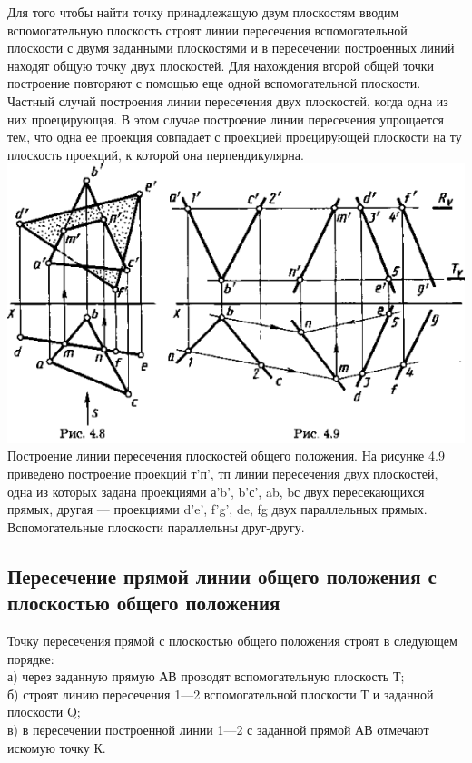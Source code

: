 \documentclass[a4paper, 12pt]{article}
\begin{document}
Для того чтобы найти точку принадлежащую двум плоскостям вводим вспомогательную плоскость строят линии пересечения вспомогательной плоскости с двумя заданными плоскостями и в пересечении построенных линий находят общую точку двух плоскостей. Для нахождения второй общей точки построение повторяют с помощью еще одной вспомогательной плоскости.\\

Частный случай построения линии пересечения двух плоскостей, когда одна из них проецирующая. В этом случае построение линии пересечения упрощается тем, что одна ее проекция совпадает с проекцией проецирующей плоскости на ту плоскость проекций, к которой она перпендикулярна.\\


\includegraphics{img/422.png}\\
Построение линии пересечения плоскостей общего положения. На рисунке 4.9 приведено построение проекций т'п', тп линии пересечения двух плоскостей, одна из которых задана проекциями а'b', b'с’, ab, bс двух пересекающихся прямых, другая — проекциями d’e’, f'g', de, fg двух параллельных прямых.\\

Вспомогательные плоскости параллельны друг-другу.\\


\subsection{ Пересечение прямой линии общего положения с плоскостью общего положения}

Точку пересечения прямой с плоскостью общего положения строят в следующем порядке:\\
а)    через заданную прямую АВ проводят вспомогательную плоскость Т;\\
б)    строят линию пересечения 1—2 вспомогательной плоскости Т и заданной плоскости Q;\\
в)    в пересечении построенной линии 1—2 с заданной прямой АВ отмечают искомую точку К.\\
\end{document}
